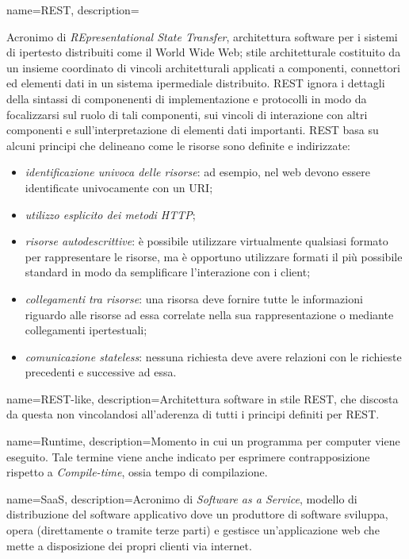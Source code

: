 {
name={REST},
description={Acronimo di \textit{REpresentational State Transfer}, architettura software per i sistemi di ipertesto distribuiti come il World Wide Web; stile architetturale costituito da un insieme coordinato di vincoli architetturali applicati a componenti, connettori ed elementi dati in un sistema ipermediale distribuito. REST ignora i dettagli della sintassi di componenenti di implementazione e protocolli in modo da focalizzarsi sul ruolo di tali componenti, sui vincoli di interazione con altri componenti e sull'interpretazione di elementi dati importanti. 
REST basa su alcuni principi che delineano come le risorse sono definite e indirizzate:
\begin{itemize}
\item \textit{identificazione univoca delle risorse}: ad esempio, nel web devono essere identificate univocamente con un URI;
\item \textit{utilizzo esplicito dei metodi HTTP};
\item \textit{risorse autodescrittive}: è possibile utilizzare virtualmente qualsiasi formato per rappresentare le risorse, ma è opportuno utilizzare formati il più possibile standard in modo da semplificare l'interazione con i client;
\item \textit{collegamenti tra risorse}: una risorsa deve fornire tutte le informazioni riguardo alle risorse ad essa correlate nella sua rappresentazione o mediante collegamenti ipertestuali;
\item \textit{comunicazione stateless}:  nessuna richiesta deve avere relazioni con le richieste precedenti e successive ad essa.
\end{itemize}}
}

{
name={REST-like},
description={Architettura software in stile REST, che discosta da questa non vincolandosi all'aderenza di tutti i principi definiti per REST.}
}

{
name={Runtime},
description={Momento in cui un programma per computer viene eseguito. Tale termine viene anche indicato per esprimere contrapposizione rispetto a \textit{Compile-time}, ossia tempo di compilazione.}
}

{
name={SaaS},
description={Acronimo di \textit{Software as a Service}, modello di distribuzione del software applicativo dove un produttore di software sviluppa, opera (direttamente o tramite terze parti) e gestisce un'applicazione web che mette a disposizione dei propri clienti via internet.}
}

